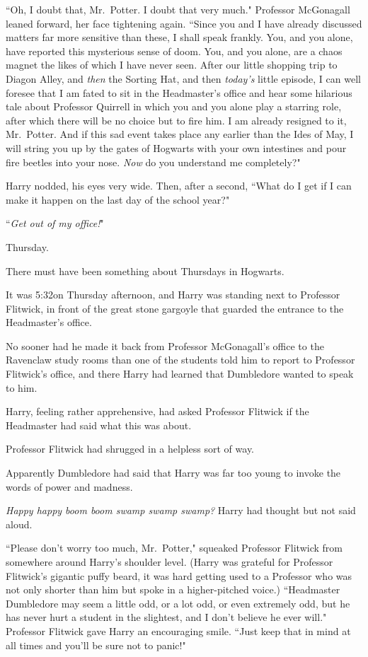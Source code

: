 ``Oh, I doubt that, Mr.~Potter. I doubt that very much." Professor McGonagall leaned forward, her face tightening again. ``Since you and I have already discussed matters far more sensitive than these, I shall speak frankly. You, and you alone, have reported this mysterious sense of doom. You, and you alone, are a chaos magnet the likes of which I have never seen. After our little shopping trip to Diagon Alley, and \emph{then} the Sorting Hat, and then \emph{today's} little episode, I can well foresee that I am fated to sit in the Headmaster's office and hear some hilarious tale about Professor Quirrell in which you and you alone play a starring role, after which there will be no choice but to fire him. I am already resigned to it, Mr.~Potter. And if this sad event takes place any earlier than the Ides of May, I will string you up by the gates of Hogwarts with your own intestines and pour fire beetles into your nose. \emph{Now} do you understand me completely?"

Harry nodded, his eyes very wide. Then, after a second, ``What do I get if I can make it happen on the last day of the school year?"

``\emph{Get out of my office!}"

\later

Thursday.

There must have been something about Thursdays in Hogwarts.

It was 5:32\pm on Thursday afternoon, and Harry was standing next to Professor Flitwick, in front of the great stone gargoyle that guarded the entrance to the Headmaster's office.

No sooner had he made it back from Professor McGonagall's office to the Ravenclaw study rooms than one of the students told him to report to Professor Flitwick's office, and there Harry had learned that Dumbledore wanted to speak to him.

Harry, feeling rather apprehensive, had asked Professor Flitwick if the Headmaster had said what this was about.

Professor Flitwick had shrugged in a helpless sort of way.

Apparently Dumbledore had said that Harry was far too young to invoke the words of power and madness.

\emph{Happy happy boom boom swamp swamp swamp?} Harry had thought but not said aloud.

``Please don't worry too much, Mr.~Potter," squeaked Professor Flitwick from somewhere around Harry's shoulder level. (Harry was grateful for Professor Flitwick's gigantic puffy beard, it was hard getting used to a Professor who was not only shorter than him but spoke in a higher-pitched voice.) ``Headmaster Dumbledore may seem a little odd, or a lot odd, or even extremely odd, but he has never hurt a student in the slightest, and I don't believe he ever will." Professor Flitwick gave Harry an encouraging smile. ``Just keep that in mind at all times and you'll be sure not to panic!"

